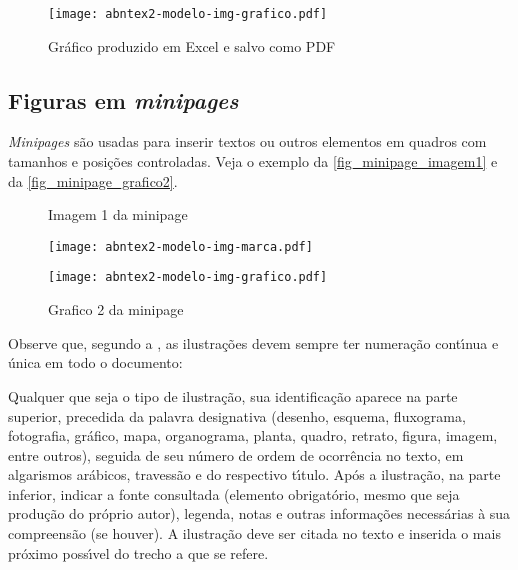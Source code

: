 \begin{figure}[htb]
	\caption{\label{fig_grafico}Gr\'{a}fico produzido em Excel e salvo como PDF}
	\begin{center}
	    \texttt{[image: abntex2-modelo-img-grafico.pdf]}
	\end{center}
\end{figure}

\subsection{Figuras em \emph{minipages}}

\emph{Minipages} s\~{a}o usadas para inserir textos ou outros elementos em quadros
com tamanhos e posi\c{c}\~{o}es controladas. Veja o exemplo da
\autoref{fig_minipage_imagem1} e da \autoref{fig_minipage_grafico2}.

\begin{figure}[htb]
 \label{teste}
 \centering
  \begin{minipage}{0.4\textwidth}
    \centering
    \caption{Imagem 1 da minipage} \label{fig_minipage_imagem1}
    \texttt{[image: abntex2-modelo-img-marca.pdf]}
  \end{minipage}
  \hfill
  \begin{minipage}{0.4\textwidth}
    \centering
    \caption{Grafico 2 da minipage} \label{fig_minipage_grafico2}
    \texttt{[image: abntex2-modelo-img-grafico.pdf]}
  \end{minipage}
\end{figure}

Observe que, segundo a , as
ilustra\c{c}\~{o}es devem sempre ter numera\c{c}\~{a}o cont\'{\i}nua e \'{u}nica em todo o documento:

\begin{citacao}
Qualquer que seja o tipo de ilustra\c{c}\~{a}o, sua identifica\c{c}\~{a}o aparece na parte
superior, precedida da palavra designativa (desenho, esquema, fluxograma,
fotografia, gr\'{a}fico, mapa, organograma, planta, quadro, retrato, figura,
imagem, entre outros), seguida de seu n\'{u}mero de ordem de ocorr\^{e}ncia no texto,
em algarismos ar\'{a}bicos, travess\~{a}o e do respectivo t\'{\i}tulo. Ap\'{o}s a ilustra\c{c}\~{a}o, na
parte inferior, indicar a fonte consultada (elemento obrigat\'{o}rio, mesmo que
seja produ\c{c}\~{a}o do pr\'{o}prio autor), legenda, notas e outras informa\c{c}\~{o}es
necess\'{a}rias \`{a} sua compreens\~{a}o (se houver). A ilustra\c{c}\~{a}o deve ser citada no
texto e inserida o mais pr\'{o}ximo poss\'{\i}vel do trecho a que se
refere. \cite[se\c{c}\~{o}es 5.8]{NBR14724:2011}
\end{citacao}

